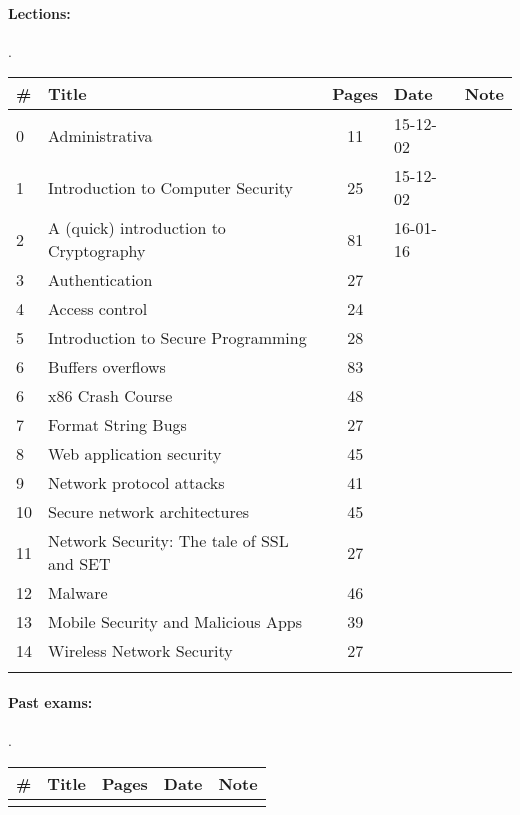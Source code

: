 \documentclass[a4paper,12pt]{article} %
\begin{document}
\paragraph{Lections:}.\\
\begin{tabularx}{\textwidth}{|l|X|c|l|c|}
	\hline
	\# & Title & Pages & Date & Note \\
	\hline
	0 & Administrativa & 11 & 15-12-02 &  \\
	\hline
	1 & Introduction to Computer Security & 25 & 15-12-02 &  \\
	\hline
	2 & A (quick) introduction to Cryptography & 81 & 16-01-16 &  \\
	\hline
	3 & Authentication & 27 &  &  \\
	\hline
	4 & Access control & 24 &  &  \\
	\hline
	5 & Introduction to Secure Programming & 28 &  &  \\
	\hline
	6 & Buffers overflows & 83 &  &  \\
	\hline
	6 & x86 Crash Course & 48 &  &  \\
	\hline
	7 & Format String Bugs & 27 &  &  \\
	\hline
	8 & Web application security & 45 &  &  \\
	\hline
	9 & Network protocol attacks & 41 &  &  \\
	\hline
	10 & Secure network architectures & 45 &  &  \\
	\hline
	11 & Network Security: The tale of SSL and SET & 27 &  &  \\
	\hline
	12 & Malware & 46 &  &  \\
	\hline
	13 & Mobile Security and Malicious Apps & 39 &  &  \\
	\hline
	14 & Wireless Network Security & 27 &  &  \\
	\hline
	&  &  &  &  \\
	\hline
\end{tabularx}

\paragraph{Past exams:}.\\
\begin{tabularx}{\textwidth}{|l|X|c|l|c|}
	\hline
	\# & Title & Pages & Date & Note \\
	\hline
	&  &  &  &  \\
	\hline
\end{tabularx}
\end{document}
